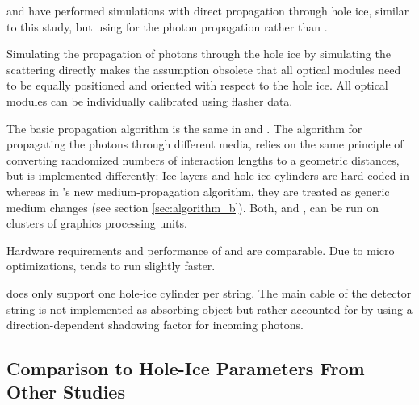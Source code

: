\chirkin and \rongen have performed simulations with direct propagation through hole ice, similar to this study, but using \ppc for the photon propagation rather than \clsim. \cite{martinspicehddard}\cite{martindardupdate}\cite{pocam}\cite{icrc17pocam}\cite{ppcpaper}


Simulating the propagation of photons through the hole ice by simulating the scattering directly makes the assumption obsolete that all optical modules need to be equally positioned and oriented with respect to the hole ice. All optical modules can be individually calibrated using flasher data. \cite{martinspicehddard}

The basic propagation algorithm is the same in \ppc and \clsim. The algorithm for propagating the photons through different media, relies on the same principle of converting randomized numbers of interaction lengths to a geometric distances, but is implemented differently: Ice layers and hole-ice cylinders are hard-coded in \ppc whereas in \clsim's new medium-propagation algorithm, they are treated as generic medium changes (see section \ref{sec:algorithm_b}). Both, \ppc and \clsim, can be run on clusters of graphics processing units.

Hardware requirements and performance of \ppc and \clsim are comparable. Due to micro optimizations, \ppc tends to run slightly faster. \mref{}

\ppc does only support one hole-ice cylinder per string. The main cable of the detector string is not implemented as absorbing object but rather accounted for by using a direction-dependent shadowing factor for incoming photons. \cite{ppcsource}\cite{ppcforhumans}


\subsection{Comparison to Hole-Ice Parameters From Other Studies}
\label{sec:angular_acceptance_comparison}\label{sec:parameter_comparison}




